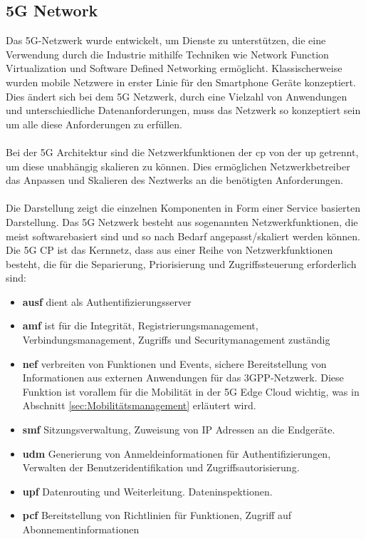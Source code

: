 \documentclass[runningheads]{llncs}
\numberwithin{figure}{section}
\begin{document}
\subsection{5G Network}
\label{subsec:5G Network}
Das 5G-Netzwerk wurde entwickelt, um Dienste zu unterstützen, 
die eine Verwendung durch die Industrie mithilfe Techniken wie 
Network Function Virtualization und Software Defined Networking ermöglicht.
Klassischerweise wurden mobile Netzwere in erster Linie für den Smartphone Geräte konzeptiert. 
Dies ändert sich bei dem 5G Netzwerk, durch eine Vielzahl von Anwendungen und unterschiedliche Datenanforderungen,
muss das Netzwerk so konzeptiert sein um alle diese Anforderungen zu erfüllen.
\\
\\
Bei der 5G Architektur sind die Netzwerkfunktionen der \acrfull{cp} von der \acrfull{up} getrennt, 
um diese unabhängig skalieren zu können. Dies ermöglichen Netzwerkbetreiber das Anpassen und Skalieren des Neztwerks an die
benötigten Anforderungen.
\\
\\
Die Darstellung zeigt die einzelnen Komponenten in Form einer Service basierten Darstellung.  \cite{5GCoreNetwork2017}
Das 5G Netzwerk besteht aus sogenannten Netzwerkfunktionen, die meist softwarebasiert sind und so nach Bedarf angepasst/skaliert werden können.
Die 5G CP ist das Kernnetz, dass aus einer Reihe von Netzwerkfunktionen besteht, 
die für die Separierung, Priorisierung und Zugriffssteuerung erforderlich sind:
\begin{itemize}
  \item \textbf{\acrfull{ausf}} dient als Authentifizierungsserver
  \item \textbf{\acrfull{amf}} ist für die Integrität, Registrierungsmanagement, Verbindungsmanagement,
  Zugriffs und Securitymanagement zuständig
  \item \textbf{\acrfull{nef}} verbreiten von Funktionen und Events, 
  sichere Bereitstellung von Informationen aus externen Anwendungen für das 3GPP-Netzwerk. Diese Funktion ist vorallem für die Mobilität
  in der 5G Edge Cloud wichtig, was in Abschnitt \ref{sec:Mobilitätsmanagement} erläutert wird.
  \item \textbf{\acrfull{smf}} Sitzungsverwaltung, Zuweisung von IP Adressen an die Endgeräte. 
  \item \textbf{\acrfull{udm}} Generierung von Anmeldeinformationen für Authentifizierungen, 
  Verwalten der Benutzeridentifikation und Zugriffsautorisierung.
  \item \textbf{\acrfull{upf}} Datenrouting und Weiterleitung. Dateninspektionen.
  \item \textbf{\acrfull{pcf}} Bereitstellung von Richtlinien für Funktionen, 
  Zugriff auf Abonnementinformationen
\end{itemize}
\end{document}
